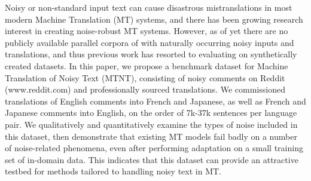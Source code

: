 Noisy or non-standard input text can cause disastrous mistranslations in most modern Machine Translation (MT) systems, and there has been growing research interest in creating noise-robust MT systems. However, as of yet there are no publicly available parallel corpora of with naturally occurring noisy inputs and translations, and thus previous work has resorted to evaluating on synthetically created datasets. In this paper, we propose a benchmark dataset for Machine Translation of Noisy Text (MTNT), consisting of noisy comments on Reddit (www.reddit.com) and professionally sourced translations. We commissioned translations of English comments into French and Japanese, as well as French and Japanese comments into English, on the order of 7k-37k sentences per language pair. We qualitatively and quantitatively examine the types of noise included in this dataset, then demonstrate that existing MT models fail badly on a number of noise-related phenomena, even after performing adaptation on a small training set of in-domain data. This indicates that this dataset can provide an attractive testbed for methods tailored to handling noisy text in MT.
